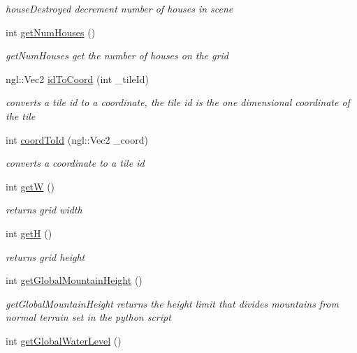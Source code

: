 \begin{DoxyCompactItemize}
\begin{DoxyCompactList}\small\item\em house\+Destroyed decrement number of houses in scene \end{DoxyCompactList}\item 
int \hyperlink{class_grid_a5c3951f16d8972674ac03d30503f566d}{get\+Num\+Houses} ()
\begin{DoxyCompactList}\small\item\em get\+Num\+Houses get the number of houses on the grid \end{DoxyCompactList}\item 
ngl\+::\+Vec2 \hyperlink{class_grid_a9eeef6b776349215a24523cc570c7122}{id\+To\+Coord} (int \+\_\+tile\+Id)
\begin{DoxyCompactList}\small\item\em converts a tile id to a coordinate, the tile id is the one dimensional coordinate of the tile \end{DoxyCompactList}\item 
int \hyperlink{class_grid_abed85ae949d4b4f7a71a27ecefcf6386}{coord\+To\+Id} (ngl\+::\+Vec2 \+\_\+coord)
\begin{DoxyCompactList}\small\item\em converts a coordinate to a tile id \end{DoxyCompactList}\item 
int \hyperlink{class_grid_a08562d512a6aba648746e5bb057ddb45}{get\+W} ()
\begin{DoxyCompactList}\small\item\em returns grid width \end{DoxyCompactList}\item 
int \hyperlink{class_grid_aefd9a1af08cb42c6b492ba48e00db985}{get\+H} ()
\begin{DoxyCompactList}\small\item\em returns grid height \end{DoxyCompactList}\item 
int \hyperlink{class_grid_a326a5bc1b98800807b6fae91c73ab93d}{get\+Global\+Mountain\+Height} ()
\begin{DoxyCompactList}\small\item\em get\+Global\+Mountain\+Height returns the height limit that divides mountains from normal terrain set in the python script \end{DoxyCompactList}\item 
int \hyperlink{class_grid_a58700cc20a47233e076aa70801f73d75}{get\+Global\+Water\+Level} ()

\end{DoxyCompactItemize}
